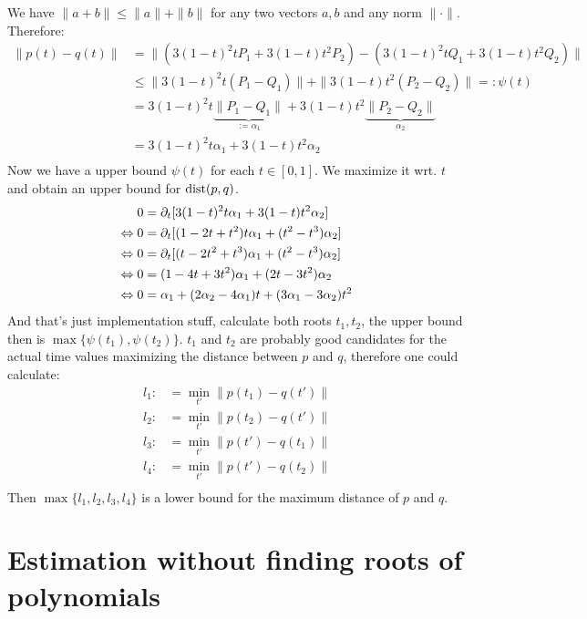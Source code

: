 We have $\|a+b\| \leq \|a\| + \|b\|$ for any two vectors $a,b$ and any norm $\|\cdot\|$.
Therefore:
%
\begin{align}
\|p(t)-q(t)\| &= \|(3(1-t)^2 t P_1 + 3 (1-t) t^2 P_2) - (3(1-t)^2 t Q_1 + 3(1-t) t^2 Q_2)\| \\
&\leq \|3(1-t)^2 t (P_1-Q_1)\| + \|3 (1-t) t^2 (P_2 - Q_2)\| =: \psi(t) \\
&= 3(1-t)^2 t \underbrace{\|P_1-Q_1\|}_{:=\alpha_1} + 3 (1-t) t^2 \underbrace{\|P_2 - Q_2\|}_{\alpha_2} \\
&= 3(1-t)^2 t \alpha_1 + 3 (1-t) t^2 \alpha_2 \\
\end{align}
%
Now we have a upper bound $\psi(t)$ for each $t \in [0,1]$.
We maximize it wrt. $t$ and obtain an upper bound for $\mathrm{dist}(p,q)$.
%
\begin{align}
0 &= \partial_t [3(1-t)^2 t \alpha_1 + 3 (1-t) t^2 \alpha_2] \\
\Leftrightarrow 0 &= \partial_t [(1-2t+t^2)t \alpha_1 + (t^2-t^3) \alpha_2] \\
\Leftrightarrow 0 &= \partial_t [(t-2t^2+t^3) \alpha_1 + (t^2-t^3) \alpha_2] \\
\Leftrightarrow 0 &= (1 - 4t+3t^2) \alpha_1 + (2t-3t^2) \alpha_2 \\
\Leftrightarrow 0 &= \alpha_1 + (2\alpha_2 - 4 \alpha_1)t + (3 \alpha_1 - 3 \alpha_2)t^2 \\
\end{align}
%
And that's just implementation stuff, calculate both roots $t_1, t_2$,
the upper bound then is $\max \{\psi(t_1), \psi(t_2)\}$.
$t_1$ and $t_2$ are probably good candidates for the actual time values
maximizing the distance between $p$ and $q$, therefore one could
calculate:
%
\begin{align}
l_1 :&= \min_{t'} \|p(t_1)-q(t')\| \\
l_2 :&= \min_{t'} \|p(t_2)-q(t')\| \\
l_3 :&= \min_{t'} \|p(t')-q(t_1)\| \\
l_4 :&= \min_{t'} \|p(t')-q(t_2)\| \\
\end{align}
%
Then $\max \{l_1, l_2, l_3, l_4\}$ is a lower bound for the maximum distance of $p$ and $q$.

\section{Estimation without finding roots of polynomials}

